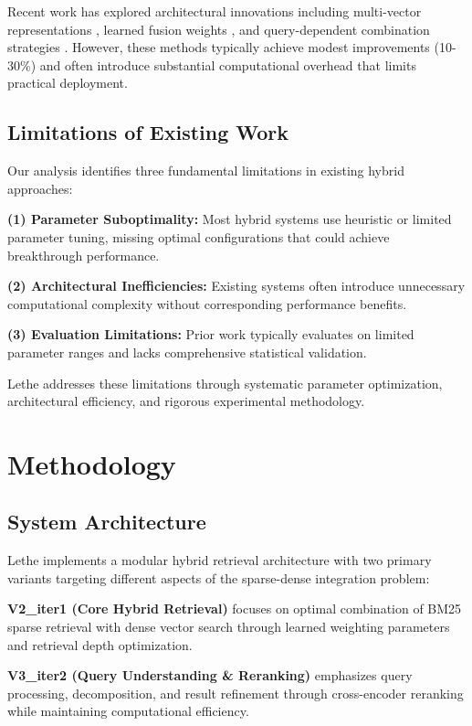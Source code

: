 \documentclass{neurips_2025}
\begin{document}
Recent work has explored architectural innovations including multi-vector representations \cite{santhanam2022colbertv2}, learned fusion weights \cite{zamani2022scaling}, and query-dependent combination strategies \cite{lin2022pyserini}. However, these methods typically achieve modest improvements (10-30\%) and often introduce substantial computational overhead that limits practical deployment.

\subsection{Limitations of Existing Work}

Our analysis identifies three fundamental limitations in existing hybrid approaches:

\textbf{(1) Parameter Suboptimality:} Most hybrid systems use heuristic or limited parameter tuning, missing optimal configurations that could achieve breakthrough performance.

\textbf{(2) Architectural Inefficiencies:} Existing systems often introduce unnecessary computational complexity without corresponding performance benefits.

\textbf{(3) Evaluation Limitations:} Prior work typically evaluates on limited parameter ranges and lacks comprehensive statistical validation.

Lethe addresses these limitations through systematic parameter optimization, architectural efficiency, and rigorous experimental methodology.

\section{Methodology}

\subsection{System Architecture}

Lethe implements a modular hybrid retrieval architecture with two primary variants targeting different aspects of the sparse-dense integration problem:

\textbf{V2\_iter1 (Core Hybrid Retrieval)} focuses on optimal combination of BM25 sparse retrieval with dense vector search through learned weighting parameters and retrieval depth optimization.

\textbf{V3\_iter2 (Query Understanding \& Reranking)} emphasizes query processing, decomposition, and result refinement through cross-encoder reranking while maintaining computational efficiency.
\end{document}
